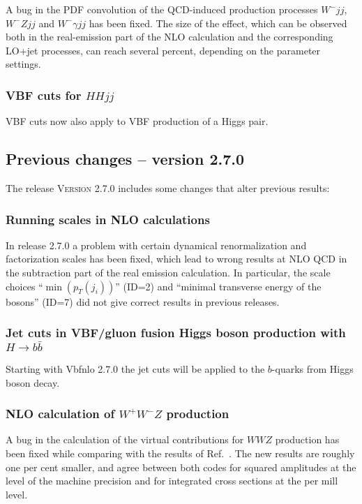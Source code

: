 \documentclass[english,12pt]{article}
\begin{document}
A bug in the PDF convolution of the QCD-induced production processes $W^-jj$,
$W^-Zjj$ and $W^-\gamma jj$ has been fixed. The size of the effect,
which can be observed both in the real-emission part of the NLO
calculation and the corresponding LO+jet processes, can reach several
percent, depending on the parameter settings.


\subsubsection{VBF cuts for $HHjj$}

VBF cuts now also apply to VBF production of a Higgs pair.


\subsection{Previous changes -- version 2.7.0}

The release \textsc{Version 2.7.0} includes some changes that alter previous results:


\subsubsection{Running scales in NLO calculations}

In release 2.7.0 a problem with certain dynamical renormalization and factorization
scales has been fixed, which lead to wrong results at NLO QCD in the subtraction part of the
real emission calculation. In particular, the scale choices ``$\min(p_T(j_i))$'' (ID=2)
and ``minimal transverse energy of the bosons'' (ID=7) did not give correct results
in previous releases.

          
\subsubsection{Jet cuts in VBF/gluon fusion Higgs boson production with $H\to b\bar{b}$}

Starting with {\sc Vbfnlo 2.7.0} the jet cuts will be applied to the
$b$-quarks from Higgs boson decay.


\subsubsection{NLO calculation of $W^+W^-Z$ production}

A bug in the calculation of the virtual contributions for $WWZ$
production has been fixed while comparing with the results of
Ref.~\cite{Nhung:2013jta}.  The new results are roughly one per cent
smaller, and agree between both codes for squared amplitudes at the
level of the machine precision and for integrated cross sections at the
per mill level.
\end{document}
